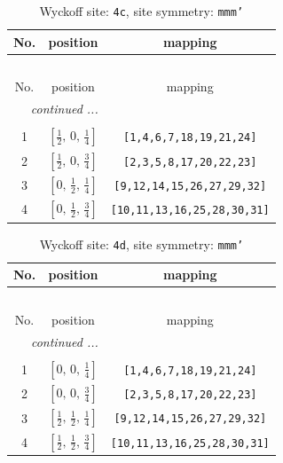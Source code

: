 \documentclass[fleqn,8pt]{jsarticle}
\begin{document}
\renewcommand{\arraystretch}{1.2}
\begin{longtable}{ccc}
\caption{Wyckoff site: {\tt 4c}, site symmetry: {\tt mmm'}}
 \\
 \hline \hline
No. & position & mapping \\ \hline \endfirsthead

\multicolumn{2}{l}{\tablename\ \thetable{}} \\
 \hline \hline
No. & position & mapping \\ \hline \endhead

 \hline \hline
\multicolumn{2}{r}{\footnotesize\it continued ...} \\ \endfoot

 \hline \hline
\multicolumn{2}{r}{} \\ \endlastfoot

1 & $\left[ \frac{1}{2},\, 0,\, \frac{1}{4} \right]$ & {\tt [1,4,6,7,18,19,21,24]} \\ \hline
2 & $\left[ \frac{1}{2},\, 0,\, \frac{3}{4} \right]$ & {\tt [2,3,5,8,17,20,22,23]} \\ \hline
3 & $\left[ 0,\, \frac{1}{2},\, \frac{1}{4} \right]$ & {\tt [9,12,14,15,26,27,29,32]} \\ \hline
4 & $\left[ 0,\, \frac{1}{2},\, \frac{3}{4} \right]$ & {\tt [10,11,13,16,25,28,30,31]} \\
\end{longtable}
\renewcommand{\arraystretch}{1.2}
\begin{longtable}{ccc}
\caption{Wyckoff site: {\tt 4d}, site symmetry: {\tt mmm'}}
 \\
 \hline \hline
No. & position & mapping \\ \hline \endfirsthead

\multicolumn{2}{l}{\tablename\ \thetable{}} \\
 \hline \hline
No. & position & mapping \\ \hline \endhead

 \hline \hline
\multicolumn{2}{r}{\footnotesize\it continued ...} \\ \endfoot

 \hline \hline
\multicolumn{2}{r}{} \\ \endlastfoot

1 & $\left[ 0,\, 0,\, \frac{1}{4} \right]$ & {\tt [1,4,6,7,18,19,21,24]} \\ \hline
2 & $\left[ 0,\, 0,\, \frac{3}{4} \right]$ & {\tt [2,3,5,8,17,20,22,23]} \\ \hline
3 & $\left[ \frac{1}{2},\, \frac{1}{2},\, \frac{1}{4} \right]$ & {\tt [9,12,14,15,26,27,29,32]} \\ \hline
4 & $\left[ \frac{1}{2},\, \frac{1}{2},\, \frac{3}{4} \right]$ & {\tt [10,11,13,16,25,28,30,31]} \\
\end{longtable}
\end{document}
